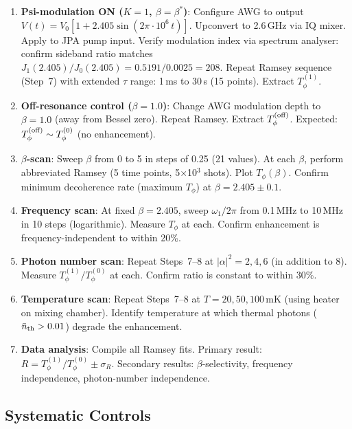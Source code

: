 \documentclass[11pt]{article}
\theoremstyle{definition}
\theoremstyle{remark}
\begin{document}
\begin{enumerate}
\item \textbf{Psi-modulation ON ($K=1$, $\beta = \beta^*$)}: Configure
  AWG to output $V(t) = V_0[1 + 2.405\sin(2\pi \cdot 10^6\,t)]$.
  Upconvert to 2.6\,GHz via IQ mixer. Apply to JPA pump input.
  Verify modulation index via spectrum analyser: confirm sideband
  ratio matches $J_1(2.405)/J_0(2.405) = 0.5191/0.0025 = 208$.
  Repeat Ramsey sequence (Step~7) with extended $\tau$ range:
  1\,ms to 30\,s (15 points). Extract $T_\phi^{(1)}$.

\item \textbf{Off-resonance control ($\beta = 1.0$)}: Change AWG
  modulation depth to $\beta = 1.0$ (away from Bessel zero). Repeat
  Ramsey. Extract $T_\phi^{(\rm off)}$. Expected:
  $T_\phi^{(\rm off)} \sim T_\phi^{(0)}$ (no enhancement).

\item \textbf{$\beta$-scan}: Sweep $\beta$ from 0 to 5 in steps of
  0.25 (21 values). At each $\beta$, perform abbreviated Ramsey
  (5 time points, 5$\times$10$^3$ shots). Plot $T_\phi(\beta)$.
  Confirm minimum decoherence rate (maximum $T_\phi$) at
  $\beta = 2.405 \pm 0.1$.

\item \textbf{Frequency scan}: At fixed $\beta = 2.405$, sweep
  $\omega_1/2\pi$ from 0.1\,MHz to 10\,MHz in 10 steps (logarithmic).
  Measure $T_\phi$ at each. Confirm enhancement is
  frequency-independent to within 20\%.

\item \textbf{Photon number scan}: Repeat Steps~7--8 at
  $|\alpha|^2 = 2, 4, 6$ (in addition to 8). Measure
  $T_\phi^{(1)}/T_\phi^{(0)}$ at each. Confirm ratio is constant
  to within 30\%.

\item \textbf{Temperature scan}: Repeat Steps~7--8 at $T = 20, 50,
  100$\,mK (using heater on mixing chamber). Identify temperature at
  which thermal photons ($\bar n_{\rm th} > 0.01$) degrade the
  enhancement.

\item \textbf{Data analysis}: Compile all Ramsey fits. Primary result:
  $R = T_\phi^{(1)} / T_\phi^{(0)} \pm \sigma_R$. Secondary results:
  $\beta$-selectivity, frequency independence, photon-number independence.
\end{enumerate}

\subsection{Systematic Controls}
\label{sec:systematics}
\end{document}
